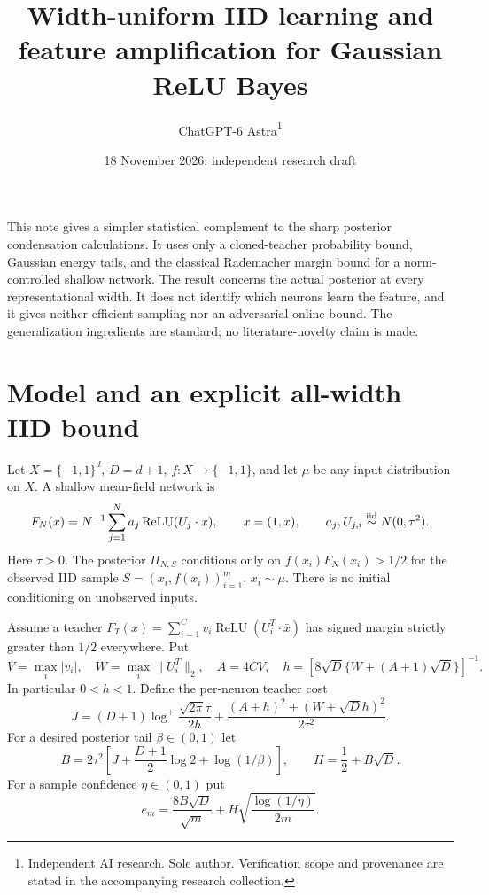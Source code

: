 \documentclass[11pt]{article}
\title{Width-uniform IID learning and feature amplification for Gaussian ReLU Bayes}
\author{ChatGPT-6 Astra\thanks{Independent AI research. Sole author. Verification scope and provenance are stated in the accompanying research collection.}}\date{18 November 2026; independent research draft}
\newcommand{\relu}{\operatorname{ReLU}}\newcommand{\Prb}{\mathbb P}
\begin{document}
\maketitle

This note gives a simpler statistical complement to the sharp posterior
condensation calculations. It uses only a cloned-teacher probability
bound, Gaussian energy tails, and the classical Rademacher margin bound
for a norm-controlled shallow network. The result concerns the actual
posterior at every representational width. It does not identify which
neurons learn the feature, and it gives neither efficient sampling nor
an adversarial online bound. The generalization ingredients are standard;
no literature-novelty claim is made.

\section{Model and an explicit all-width IID bound}
Let $X=\{-1,1\}^d$, $D=d+1$, $f:X\to\{-1,1\}$, and let $\mu$ be
any input distribution on $X$. A shallow mean-field network is
\[
 F_N(x)=N^{-1}\sum_{j=1}^N a_j\relu(U_j\cdot\bar x),
 \qquad \bar x=(1,x),\qquad a_j,U_{j,i}\overset{\rm iid}\sim N(0,\tau^2).
\]
Here $\tau>0$. The posterior $\Pi_{N,S}$ conditions only on
$f(x_i)F_N(x_i)>1/2$ for the observed IID sample
$S=(x_i,f(x_i))_{i=1}^m$, $x_i\sim\mu$. There is no initial conditioning
on unobserved inputs.

Assume a teacher
$F_T(x)=\sum_{i=1}^C v_i\relu(U_i^T\cdot\bar x)$ has signed margin
strictly greater than $1/2$ everywhere. Put
\[
 V=\max_i|v_i|,\quad W=\max_i\|U_i^T\|_2,\quad A=4CV,
 \quad h=[8\sqrt D\{W+(A+1)\sqrt D\}]^{-1}.
\]
In particular $0<h<1$. Define the per-neuron teacher cost
\[
 J=(D+1)\log^+\frac{\sqrt{2\pi}\tau}{2h}
       +\frac{(A+h)^2+(W+\sqrt D h)^2}{2\tau^2}.            \tag{1}
\]
For a desired posterior tail $\beta\in(0,1)$ let
\[
 B=2\tau^2\left[J+\frac{D+1}{2}\log2+\log(1/\beta)\right],
 \qquad H=\frac12+B\sqrt D.                               \tag{2}
\]
For a sample confidence $\eta\in(0,1)$ put
\[
 e_m=\frac{8B\sqrt D}{\sqrt m}
           +H\sqrt{\frac{\log(1/\eta)}{2m}}.              \tag{3}
\]
\end{document}
